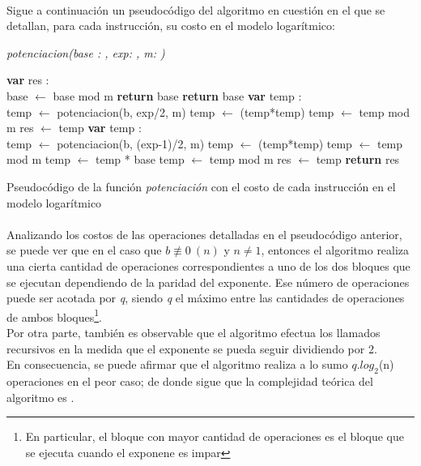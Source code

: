 \paragraph{}
Sigue a continuación un pseudocódigo del algoritmo en cuestión en el que se detallan, para cada instrucción, su costo en el modelo logarítmico: \\

\newpage
	\incmargin{1em}
	\linesnumbered

	\textsl{potenciacion(base : \nat,  exp: \nat,  m: \nat)}\\
		\begin{algorithm}[H]
			\BlankLine
			\textbf{var} res : \entero \\
			\BlankLine
			base $\leftarrow$ base mod m 
			\BlankLine
			 	{\textbf{return} base}
			{
				{\textbf{return} base}
			{
				{\textbf{var} temp : \entero \\
				temp $\leftarrow$ potenciacion(b, exp/2, m) 
				temp $\leftarrow$ (temp*temp) 
				temp $\leftarrow$ temp mod m 
				res $\leftarrow$ temp }
				{\textbf{var} temp : \entero \\
				temp $\leftarrow$ potenciacion(b, (exp-1)/2, m) 
				temp $\leftarrow$ (temp*temp) 
				temp $\leftarrow$ temp mod m 
				temp $\leftarrow$ temp * base 
				temp $\leftarrow$ temp mod m 
				res $\leftarrow$ temp }
			}}
			\BlankLine
			\textbf{return} res
			\caption{Pseudocódigo de la función \textit{potenciación} con el costo de cada instrucción en el modelo logarítmico}
		\end{algorithm}

\paragraph{}
Analizando los costos de las operaciones detalladas en el pseudocódigo anterior, se puede ver que en el caso que $b \not \equiv 0\ (n)$  y $n \neq 1$, entonces el algoritmo realiza una cierta cantidad de operaciones correspondientes a uno de los dos bloques que se ejecutan dependiendo de la paridad del exponente. Ese número de operaciones puede ser acotada por \textit{q}, siendo \textit{q} el máximo entre las cantidades de operaciones de ambos bloques\footnote{En particular, el bloque con mayor cantidad de operaciones es el bloque que se ejecuta cuando el exponene es impar}. \\
Por otra parte, también es observable que el algoritmo efectua los llamados recursivos en la medida que el exponente se pueda seguir dividiendo por 2. \\
En consecuencia, se puede afirmar que el algoritmo realiza a lo sumo $q.log_2$(n) operaciones en el peor caso; de donde sigue que la complejidad teórica del algoritmo es .


